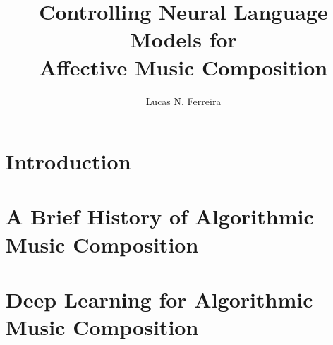 \documentclass[11pt]{ucscthesis}
\begin{document}

\title{Controlling Neural Language Models for \\ Affective Music Composition}
\author{Lucas N. Ferreira}
\deanlinethree{}

\begin{frontmatter}

\maketitle
\copyrightpage

\tableofcontents
\listoffigures
\listoftables

\begin{abstract}

\end{abstract}

% 

% 

\end{frontmatter}


\chapter{Introduction}
\label{ch:intro}


\chapter{A Brief History of Algorithmic Music Composition}
\label{ch:amc}


\chapter{Deep Learning for Algorithmic Music Composition}
\label{ch:ml}

\end{document}
